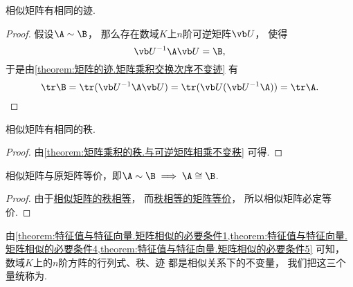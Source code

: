 \begin{property}\label{theorem:特征值与特征向量.矩阵相似的必要条件4}
相似矩阵有相同的迹.
\begin{proof}
假设\(\A\sim\B\)，
那么存在数域\(K\)上\(n\)阶可逆矩阵\(\P\)，
使得\[
	\P^{-1}\A\P=\B,
\]
于是由\cref{theorem:矩阵的迹.矩阵乘积交换次序不变迹} 有\[
	\tr\B
	= \tr(\P^{-1}\A\P)
	= \tr(\P(\P^{-1}\A))
	= \tr\A.
	\qedhere
\]
\end{proof}
\end{property}

\begin{property}\label{theorem:特征值与特征向量.矩阵相似的必要条件5}
相似矩阵有相同的秩.
\begin{proof}
由\cref{theorem:矩阵乘积的秩.与可逆矩阵相乘不变秩} 可得.
\end{proof}
\end{property}

\begin{property}
相似矩阵与原矩阵等价，即\(\A\sim\B \implies \A\cong\B\).
\begin{proof}
由于\hyperref[theorem:特征值与特征向量.矩阵相似的必要条件5]{相似矩阵的秩相等}，
而\hyperref[theorem:矩阵乘积的秩.矩阵等价的充分必要条件]{秩相等的矩阵等价}，
所以相似矩阵必定等价.
\end{proof}
\end{property}

\begin{remark}
由\cref{theorem:特征值与特征向量.矩阵相似的必要条件1,theorem:特征值与特征向量.矩阵相似的必要条件4,theorem:特征值与特征向量.矩阵相似的必要条件5} 可知，
数域\(K\)上的\(n\)阶方阵的行列式、秩、迹
都是相似关系下的不变量，
我们把这三个量统称为.
\end{remark}

